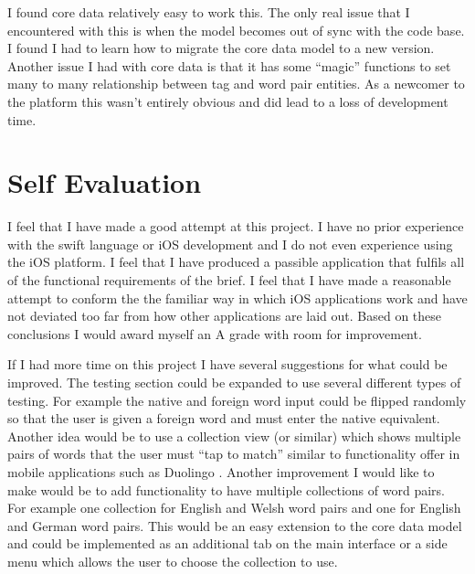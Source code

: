 \documentclass[paper=a4, fontsize=11pt]{scrartcl}	%
\numberwithin{equation}{section}															%
\numberwithin{figure}{section}																%
\numberwithin{table}{section}
\begin{document}
I found core data relatively easy to work this. The only real issue that I encountered with this is when the model becomes out of sync with the code base. I found I had to learn how to migrate the core data model to a new version. Another issue I had with core data is that it has some ``magic'' functions to set many to many relationship between tag and word pair entities. As a newcomer to the platform this wasn't entirely obvious and did lead to a loss of development time.

\section{Self Evaluation}
I feel that I have made a good attempt at this project. I have no prior experience with the swift language or iOS development and I do not even experience using the iOS platform. I feel that I have produced a passible application that fulfils all of the functional requirements of the brief. I feel that I have made a reasonable attempt to conform the the familiar way in which iOS applications work and have not deviated too far from how other applications are laid out. Based on these conclusions I would award myself an A grade with room for improvement.

If I had more time on this project I have several suggestions for what could be improved. The testing section could be expanded to use several different types of testing. For example the native and foreign word input could be flipped randomly so that the user is given a foreign word and must enter the native equivalent. Another idea would be to use a collection view (or similar) which shows multiple pairs of words that the user must ``tap to match'' similar to functionality offer in mobile applications such as Duolingo \cite{duolingo}. Another improvement I would like to make would be to add functionality to have multiple collections of word pairs. For example one collection for English and Welsh word pairs and one for English and German word pairs. This would be an easy extension to the core data model and could be implemented as an additional tab on the main interface or a side menu which allows the user to choose the collection to use. 

\clearpage
\end{document}
